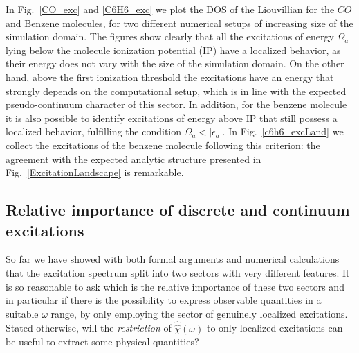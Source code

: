 \documentclass[reprint,aps,prb]{revtex4-1}
\newcommand{\eps}{\epsilon}
\newcommand{\op}[1]{\hat {#1}}
\newcommand{\sop}[1]{\op{\op {#1}}}
\begin{document}
In Fig.~\ref{CO_exc} and \ref{C6H6_exc} we plot the DOS of the Liouvillian for the $CO$  and Benzene molecules,
for two different numerical setups of increasing size of the simulation domain.
The figures show clearly that all the excitations of energy $\Omega_a$ lying below the
molecule ionization potential (IP) have a localized behavior, as their energy does not vary with the size of the simulation domain.
On the other hand, above the first ionization threshold the excitations have an energy that strongly depends on the computational
setup, which is in line with the expected pseudo-continuum character of this sector.
In addition, for the benzene molecule it is also possible to
identify excitations of energy above IP that still possess a localized behavior, fulfilling the condition $\Omega_a < |\eps_a|$.
In Fig.~\ref{c6h6_excLand} we collect the excitations of the benzene molecule following this criterion:
the agreement with the expected analytic structure presented in Fig.~\ref{ExcitationLandscape} is remarkable.

\subsection{Relative importance of discrete and continuum excitations}

So far we have showed with both formal arguments and numerical calculations that the excitation spectrum split into two sectors with very different features.
It is so reasonable to ask which is the relative importance of these two sectors and in particular if there is the possibility to express observable quantities
in a suitable $\omega$ range, by only employing the sector of genuinely localized excitations.
Stated otherwise, will the \emph{restriction} of $\sop \chi(\omega)$ to only localized excitations can be useful to extract some physical quantities?
\end{document}
